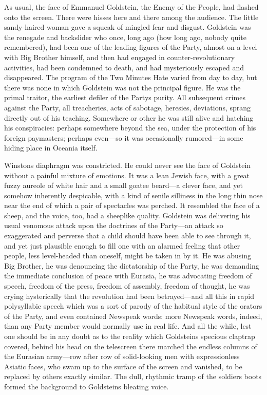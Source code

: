 As usual, the face of Emmanuel Goldstein, the Enemy of the People, had
flashed onto the screen. There were hisses here and there among the
audience. The little sandy-haired woman gave a squeak of mingled fear
and disgust. Goldstein was the renegade and backslider who once, long
ago (how long ago, nobody quite remembered), had been one of the leading
figures of the Party, almost on a level with Big Brother himself, and
then had engaged in counter-revolutionary activities, had been condemned
to death, and had mysteriously escaped and disappeared. The program of
the Two Minutes Hate varied from day to day, but there was none in which
Goldstein was not the principal figure. He was the primal traitor, the
earliest defiler of the Party\textquotesingle s purity. All subsequent
crimes against the Party, all treacheries, acts of sabotage, heresies,
deviations, sprang directly out of his teaching. Somewhere or other he
was still alive and hatching his conspiracies: perhaps somewhere beyond
the sea, under the protection of his foreign paymasters; perhaps
even---so it was occasionally rumored---in some hiding place in Oceania
itself.

Winston\textquotesingle s diaphragm was constricted. He could never see
the face of Goldstein without a painful mixture of emotions. It was a
lean Jewish face, with a great fuzzy aureole of white hair and a small
goatee beard---a clever face, and yet somehow inherently despicable,
with a kind of senile silliness in the long thin nose near the end of
which a pair of spectacles was perched. It resembled the face of a
sheep, and the voice, too, had a sheeplike quality. Goldstein was
delivering his usual venomous attack upon the doctrines of the
Party---an attack so exaggerated and perverse that a child should have
been able to see through it, and yet just plausible enough to fill one
with an alarmed feeling that other people, less level-headed than
oneself, might be taken in by it. He was abusing Big Brother, he was
denouncing the dictatorship of the Party, he was demanding the immediate
conclusion of peace with Eurasia, he was advocating freedom of speech,
freedom of the press, freedom of assembly, freedom of thought, he was
crying hysterically that the revolution had been betrayed---and all this
in rapid polysyllabic speech which was a sort of parody of the habitual
style of the orators of the Party, and even contained Newspeak words:
more Newspeak words, indeed, than any Party member would normally use in
real life. And all the while, lest one should be in any doubt as to the
reality which Goldstein\textquotesingle s specious claptrap covered,
behind his head on the telescreen there marched the endless columns of
the Eurasian army---row after row of solid-looking men with
expressionless Asiatic faces, who swam up to the surface of the screen
and vanished, to be replaced by others exactly similar. The dull,
rhythmic tramp of the soldiers\textquotesingle{} boots formed the
background to Goldstein\textquotesingle s bleating voice.

